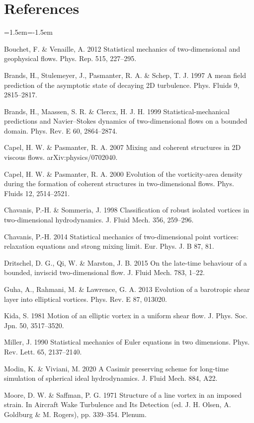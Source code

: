 \documentclass[11pt]{article}
\begin{document}
\section*{References}
\begin{small}\begin{list}{}{\leftmargin=1.5em\itemindent=-1.5em\itemsep=1pt}
\item Bouchet, F. \& Venaille, A. 2012 Statistical mechanics of two-dimensional and geophysical flows. Phys. Rep. 515, 227--295.
\item Brands, H., Stulemeyer, J., Pasmanter, R. A. \& Schep, T. J. 1997 A mean field prediction of the asymptotic state of decaying 2D turbulence. Phys. Fluids 9, 2815--2817.
\item Brands, H., Maassen, S. R. \& Clercx, H. J. H. 1999 Statistical-mechanical predictions and Navier--Stokes dynamics of two-dimensional flows on a bounded domain. Phys. Rev. E 60, 2864--2874.
\item Capel, H. W. \& Pasmanter, R. A. 2007 Mixing and coherent structures in 2D viscous flows. arXiv:physics/0702040.
\item Capel, H. W. \& Pasmanter, R. A. 2000 Evolution of the vorticity-area density during the formation of coherent structures in two-dimensional flows. Phys. Fluids 12, 2514--2521.
\item Chavanis, P.-H. \& Sommeria, J. 1998 Classification of robust isolated vortices in two-dimensional hydrodynamics. J. Fluid Mech. 356, 259--296.
\item Chavanis, P.-H. 2014 Statistical mechanics of two-dimensional point vortices: relaxation equations and strong mixing limit. Eur. Phys. J. B 87, 81.
\item Dritschel, D. G., Qi, W. \& Marston, J. B. 2015 On the late-time behaviour of a bounded, inviscid two-dimensional flow. J. Fluid Mech. 783, 1--22.
\item Guha, A., Rahmani, M. \& Lawrence, G. A. 2013 Evolution of a barotropic shear layer into elliptical vortices. Phys. Rev. E 87, 013020.
\item Kida, S. 1981 Motion of an elliptic vortex in a uniform shear flow. J. Phys. Soc. Jpn. 50, 3517--3520.
\item Miller, J. 1990 Statistical mechanics of Euler equations in two dimensions. Phys. Rev. Lett. 65, 2137--2140.
\item Modin, K. \& Viviani, M. 2020 A Casimir preserving scheme for long-time simulation of spherical ideal hydrodynamics. J. Fluid Mech. 884, A22.
\item Moore, D. W. \& Saffman, P. G. 1971 Structure of a line vortex in an imposed strain. In Aircraft Wake Turbulence and Its Detection (ed. J. H. Olsen, A. Goldburg \& M. Rogers), pp. 339--354. Plenum.

\end{list}
\end{small}
\end{document}
